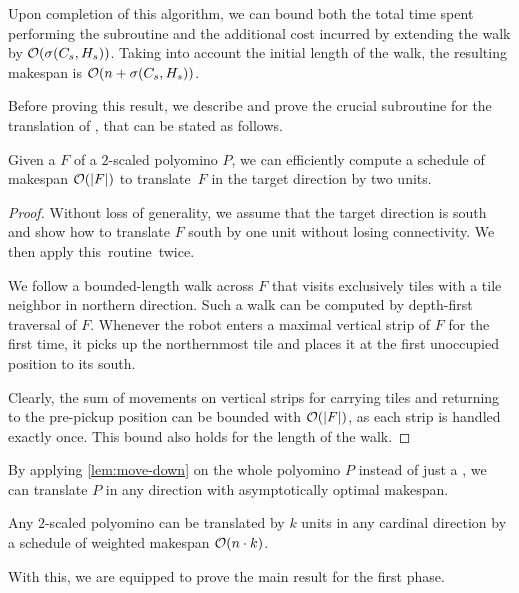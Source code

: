 Upon completion of this algorithm, we can bound both the total time spent performing the subroutine and the additional cost incurred by extending the walk by $\mathcal{O}(\sigma(C_s,H_s))$.
Taking into account the initial length of the walk, the resulting makespan is $\mathcal{O}(n+\sigma(C_s,H_s))$.

Before proving this result, we describe and prove the crucial subroutine for the translation of \comps, that can be stated as follows.

\begin{lemma}
    \label{lem:move-down}
    Given a \comp{} $F$ of a $2$-scaled polyomino $P$, we can efficiently compute a schedule of makespan $\mathcal{O}(|F|)$ to translate~$F$ in the target direction by two units.
\end{lemma}

\begin{proof}
    Without loss of generality, we assume that the target direction is south
    and show how to translate $F$ south by one unit without losing connectivity.
    We then apply this~routine~twice.

    We follow a bounded-length walk across $F$
    that visits exclusively tiles with a tile neighbor in northern direction.
    Such a walk can be computed by depth-first traversal of $F$.
    Whenever the robot enters a maximal vertical strip of $F$ for the first time, it picks up the northernmost tile and places it at the first unoccupied position to its south.

    Clearly, the sum of movements on vertical strips for carrying tiles and returning to the pre-pickup position can be bounded with $\mathcal{O}(|F|)$, as each strip is handled exactly once.
    This bound also holds for the length of the walk.
\end{proof}

By applying \cref{lem:move-down} on the whole polyomino $P$ instead of just a \comp, we can translate $P$
in any direction with asymptotically optimal makespan.

\begin{corollary}
    \label{cor:translation}
    Any $2$-scaled polyomino can be translated by $k$ units in any cardinal direction by a schedule of weighted makespan $\mathcal{O}(n\cdot k)$.
\end{corollary}

With this, we are equipped to prove the main result for the first phase.

